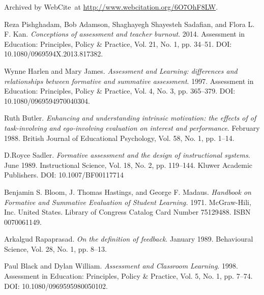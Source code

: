 \begin{thebibliography}{9}
Archived by WebCite\textsuperscript{\textregistered}\ at
\url{http://www.webcitation.org/6O7OhF8LW}.


Reza Pishghadam, Bob Adamson, Shaghayegh Shayesteh Sadafian, and Flora L. F.
Kan. \emph{Conceptions of assessment and teacher burnout}. 2014. Assessment in
Education: Principles, Policy \& Practice, Vol. 21, No. 1, pp. 34--51. DOI:
10.1080/0969594X.2013.817382.


Wynne Harlen and Mary James. \emph{Assessment and Learning: differences and
relationships between formative and summative assessment}. 1997. Assessment in
Education: Principles, Policy \& Practice, Vol. 4, No. 3, pp. 365--379. DOI:
10.1080/0969594970040304.


Ruth Butler. \emph{Enhancing and understanding intrinsic motivation: the
effects of of task-involving and ego-involving evaluation on interest and
performance}. February 1988. British Journal of Educational Psychology, Vol.
58, No. 1, pp. 1--14.


D.Royce Sadler. \emph{Formative assessment and the design of instructional
systems}. June 1989. Instructional Science, Vol. 18, No. 2, pp. 119--144.
Kluwer Academic Publishers. DOI: 10.1007/BF00117714


Benjamin S. Bloom, J. Thomas Hastings, and George F. Madaus. \emph{Handbook on
Formative and Summative Evaluation of Student Learning.} 1971. McGraw-Hili,
Inc. United States. Library of Congress Catalog Card Number 75129488. ISBN
0070061149.


Arkalgud Rapaprasad. \emph{On the definition of feedback}. January 1989.
Behavioural Science, Vol. 28, No. 1, pp. 8--13.


Paul Black and Dylan William. \emph{Assessment and Classroom Learning}. 1998.
Assessment in Education: Principles, Policy \& Practice, Vol. 5, No. 1, pp.
7--74. DOI: 10.1080/0969595980050102.



\end{thebibliography}
